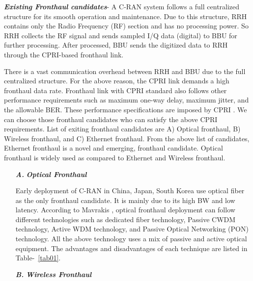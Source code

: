 \begin{multicols}{2}
\textit{\textbf {Existing Fronthaul candidates}}- A C-RAN system follows a full centralized structure for its smooth operation and maintenance. Due to this structure, RRH contains only the Radio Frequency (RF) section and has no processing power. So RRH collects the RF signal and sends sampled I/Q data (digital) to BBU for further processing. After processed, BBU sends the digitized data to RRH through the CPRI-based fronthaul link.


There is a vast communication overhead between RRH and BBU due to the full centralized structure. For the above reason, the CPRI link demands a high fronthaul data rate. Fronthaul link with CPRI standard also follows other performance requirements such as maximum one-way delay, maximum jitter, and the allowable BER. These performance specifications are imposed by CPRI \cite{art3-key41}. We can choose those fronthaul candidates who can satisfy the above CPRI requirements. List of exiting fronthaul candidates are A) Optical fronthaul, B) Wireless fronthaul, and C) Ethernet fronthaul. From the above list of candidates, Ethernet fronthaul is a novel and emerging, fronthaul candidate. Optical fronthaul is widely used as compared to Ethernet and Wireless fronthaul.

\begin{itemize}

\item[{\textit{\textbf{ A.}}}] {\textit{\textbf{Optical Fronthaul}}}

Early deployment of C-RAN in China, Japan, South Korea use optical fiber as the only fronthaul candidate. It is mainly due to its high BW and low latency. According to Mavrakis \cite{art3-key42}, optical fronthaul deployment can follow different technologies such as dedicated fiber technology, Passive CWDM technology, Active WDM technology, and Passive Optical Networking (PON) technology. All the above technology uses a mix of passive and active optical equipment. The advantages and disadvantages of each technique are listed in Table-~\ref{tab01}.

\item[{\textit{\textbf{ B.}}}] {\textit{\textbf{Wireless Fronthaul}}}


\end{itemize}
\end{multicols}
